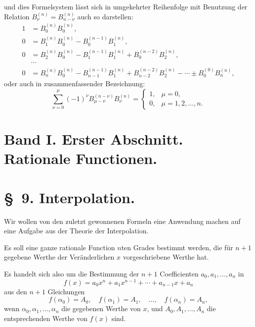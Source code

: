 \documentclass[11pt]{article}
\begin{document}
und dies Formelsystem lässt sich in umgekehrter Reihenfolge mit Benutzung der Relation $B_\nu^{(n)}=B_{n-\nu}^{(n)}$ auch so darstellen:
\begin{equation}
\begin{aligned}
1&=B_0^{(n)}B_0^{(n)},\\
0&=B_1^{(n)}B_0^{(n)}-B_0^{(n-1)}B_1^{(n)},\\
0&=B_2^{(n)}B_0^{(n)}-B_1^{(n-1)}B_1^{(n)}+B_0^{(n-2)}B_2^{(n)},\\
&\cdots\\
0&=B_n^{(n)}B_0^{(n)}-B_{n-1}^{(n-1)}B_1^{(n)}+B_{n-2}^{(n-2)}B_2^{(n)}-\cdots\pm B_0^{(0)}B_n^{(n)},
\end{aligned}
\tag{7}
\end{equation}
oder auch in zusammenfassender Bezeichnung:
\begin{equation}
 \sum_{\nu=0}^{\mu}(-1)^\nu B_{\mu-\nu}^{(n-\nu)}B_\nu^{(n)}
 =\begin{cases}
 1,&\mu=0,\\
 0,&\mu=1,2,\ldots,n.
 \end{cases}
\tag{8}
\end{equation}


\clearpage
\section*{Band I. Erster Abschnitt. Rationale Functionen.}

\section*{\S~9. Interpolation.}

Wir wollen von den zuletzt gewonnenen Formeln eine Anwendung machen auf eine Aufgabe aus der Theorie der Interpolation.

Es soll eine ganze rationale Function $n$ten Grades bestimmt werden, die für $n+1$ gegebene Werthe der Veränderlichen $x$ vorgeschriebene Werthe hat.

Es handelt sich also um die Bestimmung der $n+1$ Coefficienten $a_0,a_1,\ldots,a_n$ in
\begin{equation}
 f(x)=a_0x^n+a_1x^{n-1}+\cdots+a_{n-1}x+a_n
\tag{1}
\end{equation}
aus den $n+1$ Gleichungen
\begin{equation}
 f(\alpha_0)=A_0,\quad f(\alpha_1)=A_1,\quad \ldots,\quad f(\alpha_n)=A_n,
\tag{2}
\end{equation}
wenn $\alpha_0,\alpha_1,\ldots,\alpha_n$ die gegebenen Werthe von $x$, und $A_0,A_1,\ldots,A_n$ die entsprechenden Werthe von $f(x)$ sind.
\end{document}
